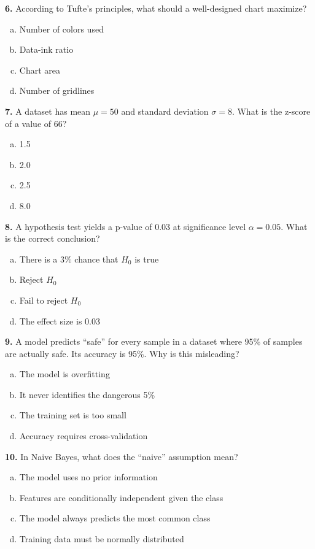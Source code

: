 \documentclass[11pt,a4paper]{article}
\begin{document}
\noindent\textbf{6.} According to Tufte's principles, what should a well-designed chart maximize?
\begin{enumerate}[(a)]
\item Number of colors used
\item Data-ink ratio
\item Chart area
\item Number of gridlines
\end{enumerate}

\vspace{0.3cm}

\noindent\textbf{7.} A dataset has mean $\mu = 50$ and standard deviation $\sigma = 8$. What is the z-score of a value of 66?
\begin{enumerate}[(a)]
\item 1.5
\item 2.0
\item 2.5
\item 8.0
\end{enumerate}

\vspace{0.3cm}

\noindent\textbf{8.} A hypothesis test yields a p-value of 0.03 at significance level $\alpha = 0.05$. What is the correct conclusion?
\begin{enumerate}[(a)]
\item There is a 3\% chance that $H_0$ is true
\item Reject $H_0$
\item Fail to reject $H_0$
\item The effect size is 0.03
\end{enumerate}

\vspace{0.3cm}

\noindent\textbf{9.} A model predicts ``safe'' for every sample in a dataset where 95\% of samples are actually safe. Its accuracy is 95\%. Why is this misleading?
\begin{enumerate}[(a)]
\item The model is overfitting
\item It never identifies the dangerous 5\%
\item The training set is too small
\item Accuracy requires cross-validation
\end{enumerate}

\vspace{0.3cm}

\noindent\textbf{10.} In Naive Bayes, what does the ``naive'' assumption mean?
\begin{enumerate}[(a)]
\item The model uses no prior information
\item Features are conditionally independent given the class
\item The model always predicts the most common class
\item Training data must be normally distributed
\end{enumerate}
\end{document}
